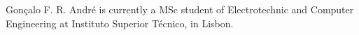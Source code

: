 \documentclass[journal]{IEEEtran}
\begin{document}
% 


\begin{IEEEbiographynophoto}{Gon\c{c}alo F. R. Andr\'e}
    is currently a MSc student of Electrotechnic and Computer Engineering at Instituto Superior T\'ecnico, in Lisbon.
\end{IEEEbiographynophoto}
%
%




\end{document}
